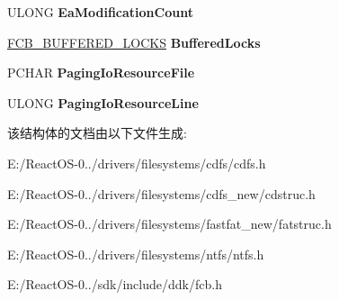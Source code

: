 \begin{DoxyCompactItemize}
\begin{tabbing}
\end{tabbing}\item 
\mbox{\label{struct___f_c_b_a498eae066cd555d86d9d626960c051e8}} 
U\+L\+O\+NG {\bfseries Ea\+Modification\+Count}
\item 
\mbox{\label{struct___f_c_b_ab7dd9127a2ce0d83d6df8d7771fa2e25}} 
\hyperlink{struct___f_c_b___b_u_f_f_e_r_e_d___l_o_c_k_s}{F\+C\+B\+\_\+\+B\+U\+F\+F\+E\+R\+E\+D\+\_\+\+L\+O\+C\+KS} {\bfseries Buffered\+Locks}
\item 
\mbox{\label{struct___f_c_b_ad75946f5f0f70d4fc705e289733203a4}} 
P\+C\+H\+AR {\bfseries Paging\+Io\+Resource\+File}
\item 
\mbox{\label{struct___f_c_b_aecdaed252907dc1d968d1ffb51b93cf6}} 
U\+L\+O\+NG {\bfseries Paging\+Io\+Resource\+Line}
\end{DoxyCompactItemize}


该结构体的文档由以下文件生成\+:\begin{DoxyCompactItemize}
\item 
E\+:/\+React\+O\+S-\/0../drivers/filesystems/cdfs/cdfs.\+h\item 
E\+:/\+React\+O\+S-\/0../drivers/filesystems/cdfs\+\_\+new/cdstruc.\+h\item 
E\+:/\+React\+O\+S-\/0../drivers/filesystems/fastfat\+\_\+new/fatstruc.\+h\item 
E\+:/\+React\+O\+S-\/0../drivers/filesystems/ntfs/ntfs.\+h\item 
E\+:/\+React\+O\+S-\/0../sdk/include/ddk/fcb.\+h\end{DoxyCompactItemize}
